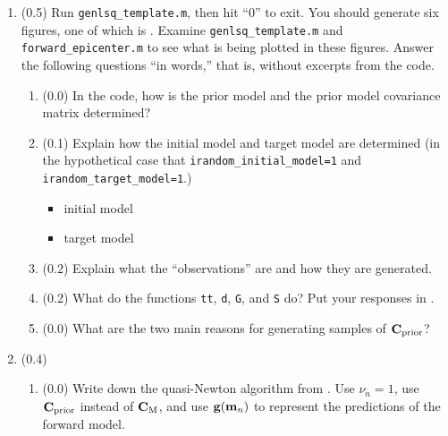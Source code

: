 \documentclass[11pt,titlepage,fleqn]{article}
\begin{document}
\clearpage\pagebreak
\begin{enumerate}
\item (0.5)
Run \verb+genlsq_template.m+, then hit ``0'' to exit. You should generate six figures, one of which is . Examine \verb+genlsq_template.m+ and \verb+forward_epicenter.m+ to see what is being plotted in these figures. Answer the following questions ``in words,'' that is, without excerpts from the code.

\begin{enumerate}
\item (0.0) In the code, how is the prior model and the prior model covariance matrix determined?

\vspace{1cm}

\item (0.1) Explain how the initial model and target model are determined (in the hypothetical case that \verb+irandom_initial_model=1+ and \verb+irandom_target_model=1+.)

\begin{itemize}
\item initial model
\item target model
\end{itemize}

\item (0.2) Explain what the ``observations'' are and how they are generated.

\vspace{1cm}

\item (0.2) What do the functions \verb+tt+, \verb+d+, \verb+G+, and \verb+S+ do? Put your responses in .

\item (0.0) What are the two main reasons for generating samples of $\mbox{${\bf C}$}_{\rm prior}$?

\vspace{1cm}

\end{enumerate}



\item (0.4) 

\begin{enumerate}
\item (0.0) Write down the quasi-Newton algorithm from \citet[][Eq.~6.319]{Tarantola2005}. Use $\nu_n = 1$, use $\mbox{${\bf C}$}_{\rm prior}$ instead of $\mbox{${\bf C}$}_{\rm M}$, and use $\mbox{${\bf g}$}(\mbox{${\bf m}$}_n)$ to represent the predictions of the forward model.


\end{enumerate}
\end{enumerate}
\end{document}
